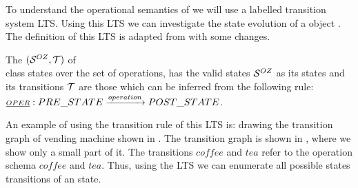 To understand the operational semantics of \oz{} we will use  a labelled transition system LTS. Using this LTS we can investigate the state evolution of a \oz{} object . The definition of this LTS is adapted from  with some changes.

\begin{definition}[LTS of \oz{}]
\label{def_oz_trans_system}
The  $(\stats,\traces)$ of \oz{} \\class states over the set of operations, has the valid states $\mathcal S^{OZ}$ as its states and its transitions $\traces$ are those which can be inferred from the following rule: \\$\underline{\scriptstyle{OPER}}: PRE\_STATE \xrightarrow{operation} POST\_STATE$.
\end{definition}
An example of using the transition rule of this LTS is: drawing the transition graph of vending machine shown in  . The transition graph is shown in , where we show only a small part of it. The transitions $coffee$ and $tea$ refer to the operation schema $coffee$ and $tea$. Thus, using the LTS we can enumerate all possible states transitions of an \oz{} state.


